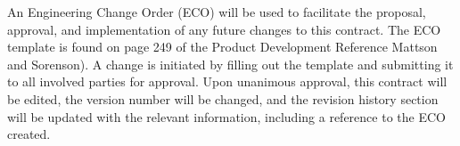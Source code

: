 


An Engineering Change Order (ECO) will be used to facilitate the proposal, approval, and implementation of any future changes to this contract. The ECO template is found on page 249 of the Product Development Reference Mattson and Sorenson). A change is initiated by filling out the template and submitting it to all involved parties for approval. Upon unanimous approval, this contract will be edited, the version number will be changed, and the revision history section will be updated with the relevant information, including a reference to the ECO created.
